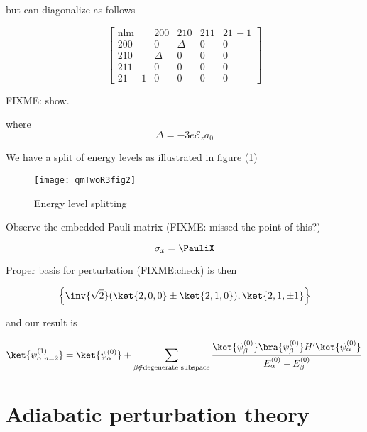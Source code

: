 but can diagonalize as follows

\begin{equation}\label{eqn:qmTwoR3:570}
\begin{bmatrix}
\text{nlm} & 200 & 210 & 211 & 21\,-1 \\
200    & 0 & \Delta & 0 & 0 \\
210    & \Delta & 0 & 0 & 0 \\
211    & 0 & 0 & 0 & 0 \\
21\,-1 & 0 & 0 & 0 & 0
\end{bmatrix}
\end{equation}

FIXME: show.

where
\begin{equation}\label{eqn:qmTwoR3:590}
\Delta = -3 e \mathcal{E}_z a_0
\end{equation}

We have a split of energy levels as illustrated in figure (\ref{fig:qmTwoR3:qmTwoR3fig2})

\begin{figure}[htp]
   \centering
   \texttt{[image: qmTwoR3fig2]}
   \caption{Energy level splitting}\label{fig:qmTwoR3:qmTwoR3fig2}
\end{figure}

Observe the embedded Pauli matrix (FIXME: missed the point of this?)

\begin{equation}\label{eqn:qmTwoR3:330}
\sigma_x = \PauliX
\end{equation}

Proper basis for perturbation (FIXME:check) is then

\begin{equation}\label{eqn:qmTwoR3:350}
\left\{
\inv{\sqrt{2}}
( 
\ket{2,0,0} 
\pm 
\ket{2,1,0} 
), 
\ket{2, 1, \pm 1}
\right\}
\end{equation}

and our result is

\begin{equation}\label{eqn:qmTwoR3:370}
\ket{\psi_{\alpha, n=2}^{(1)}} = 
\ket{\psi_{\alpha}^{(0)}} 
+\sum_{\beta \notin \text{degenerate subspace}} \frac{ 
\ket{\psi_\beta^{(0)}} \bra{\psi_\beta^{(0)}} H' \ket{\psi_\alpha^{(0)}} 
}{
E_\alpha^{(0)} 
-E_\beta^{(0)} 
}
\end{equation}

\section{Adiabatic perturbation theory}

